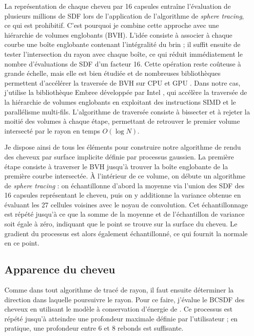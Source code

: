 La représentation de chaque cheveu par 16 capsules entraîne l'évaluation de plusieurs millions de SDF lors de l'application de l'algorithme de \textit{sphere tracing}, ce qui est prohibitif. C'est pourquoi je combine cette approche avec une hiérarchie de volumes englobants (BVH). L'idée consiste à associer à chaque courbe une boîte englobante contenant l'intégralité du brin ; il suffit ensuite de tester l'intersection du rayon avec chaque boîte, ce qui réduit immédiatement le nombre d'évaluations de SDF d'un facteur 16. Cette opération reste coûteuse à grande échelle, mais elle est bien étudiée et de nombreuses bibliothèques permettent d'accélérer la traversée de BVH sur CPU et GPU \cite{karras2012bvh}. Dans notre cas, j'utilise la bibliothèque Embree développée par Intel \cite{wald2014embree}, qui accélère la traversée de la hiérarchie de volumes englobants en exploitant des instructions SIMD et le parallélisme multi-fils. L'algorithme de traversée consiste à bissecter et à rejeter la moitié des volumes à chaque étape, permettant de retrouver le premier volume intersecté par le rayon en temps $O(\log N)$.

Je dispose ainsi de tous les éléments pour construire notre algorithme de rendu des cheveux par surface implicite définie par processus gaussien. La première étape consiste à traverser le BVH jusqu'à trouver la boîte englobante de la première courbe intersectée. À l'intérieur de ce volume, on débute un algorithme de \textit{sphere tracing} : on échantillonne d'abord la moyenne via l'union des SDF des 16 capsules représentant le cheveu, puis on y additionne la variance obtenue en évaluant les 27 cellules voisines avec le noyau de convolution. Cet échantillonnage est répété jusqu'à ce que la somme de la moyenne et de l'échantillon de variance soit égale à zéro, indiquant que le point se trouve sur la surface du cheveu. Le gradient du processus est alors également échantillonné, ce qui fournit la normale en ce point.

\subsection{Apparence du cheveu}
Comme dans tout algorithme de tracé de rayon, il faut ensuite déterminer la direction dans laquelle poursuivre le rayon. Pour ce faire, j'évalue le BCSDF des cheveux en utilisant le modèle à conservation d'énergie de \textcite{deon2011egsr}. Ce processus est répété jusqu'à atteindre une profondeur maximale définie par l'utilisateur ; en pratique, une profondeur entre 6 et 8 rebonds est suffisante.

